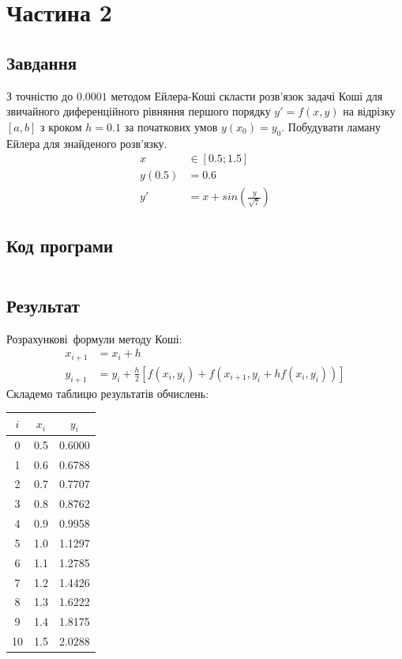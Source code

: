 \section{Частина 2}
\label{sec:task2}

\subsection{Завдання}
\label{subsec:task2_task}

З точністю до $0.0001$ методом Ейлера-Коші скласти розв'язок задачі Коші
для звичайного диференційного рівняння першого порядку
$y' = f(x, y)$ на відрізку $[a, b]$ з кроком $h = 0.1$
за початкових умов $y(x_0) = y_0$.
Побудувати ламану Ейлера для знайденого розв'язку.
\begin{align}
    x      & \in [0.5; 1.5]                \\
    y(0.5) & = 0.6                         \\
    y'     & = x + sin(\frac{y}{\sqrt{7}})
\end{align}

\subsection{Код програми}
\label{subsec:task2_code}
\inputminted{python}{../src/task2.py}

\subsection{Результат}
\label{subsec:task2_result}

Розрахункові формули методу Коші:
\begin{align}
    x_{i+1} & = x_i + h                                                            \\
    y_{i+1} & = y_i + \frac{h}{2}[f(x_i, y_i) + f(x_{i + 1}, y_i + h f(x_i, y_i))]
\end{align}
Складемо таблицю результатів обчислень:

\begin{tabular}{|c|c|c|}
    \toprule
    $i$ & $x_i$ & $y_i$  \\

    \midrule
    0   & 0.5   & 0.6000 \\
    \hline
    1   & 0.6   & 0.6788 \\
    \hline
    2   & 0.7   & 0.7707 \\
    \hline
    3   & 0.8   & 0.8762 \\
    \hline
    4   & 0.9   & 0.9958 \\
    \hline
    5   & 1.0   & 1.1297 \\
    \hline
    6   & 1.1   & 1.2785 \\
    \hline
    7   & 1.2   & 1.4426 \\
    \hline
    8   & 1.3   & 1.6222 \\
    \hline
    9   & 1.4   & 1.8175 \\
    \hline
    10  & 1.5   & 2.0288 \\

    \bottomrule
\end{tabular}

